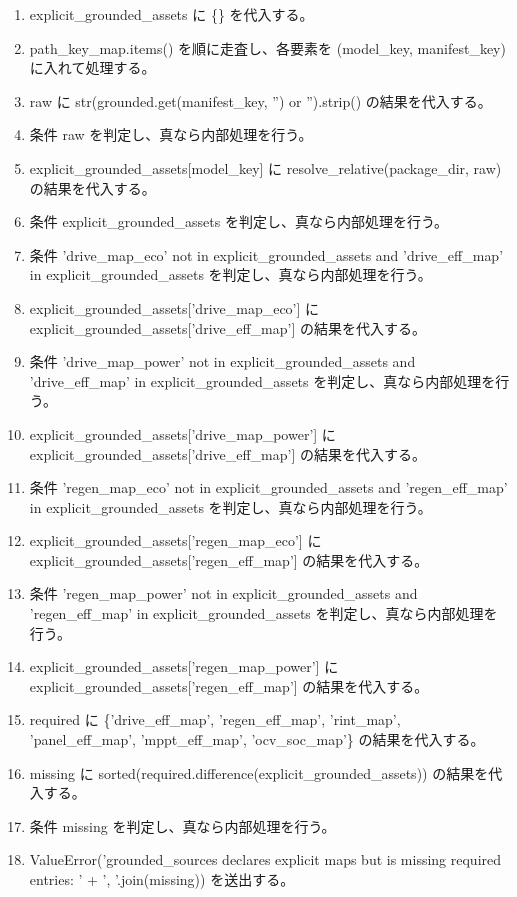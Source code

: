 \documentclass[a4paper,11pt]{article}
\begin{document}
\begin{enumerate}[leftmargin=1.8em]
\item explicit\_grounded\_assets に \{\} を代入する。
\item path\_key\_map.items() を順に走査し、各要素を (model\_key, manifest\_key) に入れて処理する。
\item   raw に str(grounded.get(manifest\_key, '') or '').strip() の結果を代入する。
\item   条件 raw を判定し、真なら内部処理を行う。
\item     explicit\_grounded\_assets[model\_key] に resolve\_relative(package\_dir, raw) の結果を代入する。
\item 条件 explicit\_grounded\_assets を判定し、真なら内部処理を行う。
\item   条件 'drive\_map\_eco' not in explicit\_grounded\_assets and 'drive\_eff\_map' in explicit\_grounded\_assets を判定し、真なら内部処理を行う。
\item     explicit\_grounded\_assets['drive\_map\_eco'] に explicit\_grounded\_assets['drive\_eff\_map'] の結果を代入する。
\item   条件 'drive\_map\_power' not in explicit\_grounded\_assets and 'drive\_eff\_map' in explicit\_grounded\_assets を判定し、真なら内部処理を行う。
\item     explicit\_grounded\_assets['drive\_map\_power'] に explicit\_grounded\_assets['drive\_eff\_map'] の結果を代入する。
\item   条件 'regen\_map\_eco' not in explicit\_grounded\_assets and 'regen\_eff\_map' in explicit\_grounded\_assets を判定し、真なら内部処理を行う。
\item     explicit\_grounded\_assets['regen\_map\_eco'] に explicit\_grounded\_assets['regen\_eff\_map'] の結果を代入する。
\item   条件 'regen\_map\_power' not in explicit\_grounded\_assets and 'regen\_eff\_map' in explicit\_grounded\_assets を判定し、真なら内部処理を行う。
\item     explicit\_grounded\_assets['regen\_map\_power'] に explicit\_grounded\_assets['regen\_eff\_map'] の結果を代入する。
\item   required に \{'drive\_eff\_map', 'regen\_eff\_map', 'rint\_map', 'panel\_eff\_map', 'mppt\_eff\_map', 'ocv\_soc\_map'\} の結果を代入する。
\item   missing に sorted(required.difference(explicit\_grounded\_assets)) の結果を代入する。
\item   条件 missing を判定し、真なら内部処理を行う。
\item     ValueError('grounded\_sources declares explicit maps but is missing required entries: ' + ', '.join(missing)) を送出する。

\end{enumerate}
\end{document}

